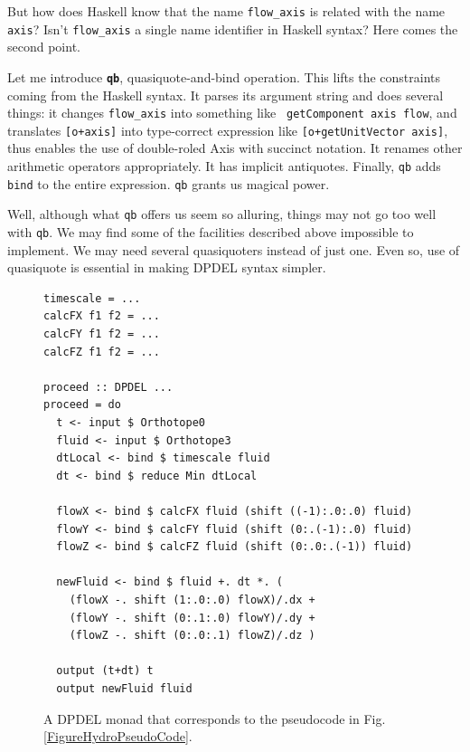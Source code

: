 \documentclass[twocolumn]{article}
\begin{document}
But how does Haskell know that the name {\tt flow\_axis} is related with the
name {\tt axis}? Isn't {\tt flow\_axis} a single name identifier in Haskell
syntax? Here comes the second point.

Let me introduce {\bf \tt qb}, quasiquote-and-bind operation. This lifts the
constraints coming from the Haskell syntax. It parses its argument string and
does several things: it changes {\tt flow\_axis} into something like {\tt
  getComponent axis flow}, and translates {\tt [o+axis]} into type-correct
expression like {\tt [o+getUnitVector axis]}, thus enables the use of
double-roled Axis with succinct notation. It renames other arithmetic
operators appropriately.  It has implicit antiquotes. Finally, {\tt qb} adds
{\tt bind} to the entire expression. {\tt qb} grants us magical power.

Well, although what {\tt qb} offers us seem so alluring, things may not go too
well with {\tt qb}. We may find some of the facilities described above
impossible to implement. We may need several quasiquoters instead of just
one. Even so, use of quasiquote is essential in making DPDEL syntax simpler.

\begin{figure}
\begin{verbatim}
timescale = ...
calcFX f1 f2 = ...
calcFY f1 f2 = ...
calcFZ f1 f2 = ...

proceed :: DPDEL ...
proceed = do
  t <- input $ Orthotope0
  fluid <- input $ Orthotope3
  dtLocal <- bind $ timescale fluid
  dt <- bind $ reduce Min dtLocal

  flowX <- bind $ calcFX fluid (shift ((-1):.0:.0) fluid)
  flowY <- bind $ calcFY fluid (shift (0:.(-1):.0) fluid)
  flowZ <- bind $ calcFZ fluid (shift (0:.0:.(-1)) fluid)
  
  newFluid <- bind $ fluid +. dt *. (
    (flowX -. shift (1:.0:.0) flowX)/.dx +
    (flowY -. shift (0:.1:.0) flowY)/.dy +
    (flowZ -. shift (0:.0:.1) flowZ)/.dz )

  output (t+dt) t
  output newFluid fluid

\end{verbatim}
\caption{A DPDEL monad that corresponds to the pseudocode in
  Fig. \ref{FigureHydroPseudoCode}.}\label{FigureDPDEL1}
\end{figure}
\end{document}

